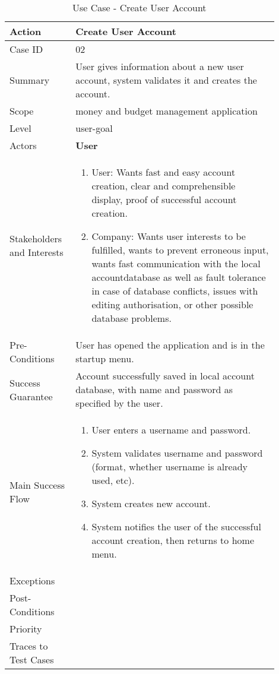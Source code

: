 \documentclass[11pt]{article}
\newcounter{use case ID}
\newcommand\tabularhead[1]{
\begin{table}[ht]
    \addtocounter{use case ID}{1}
    \caption{Use Case \arabic{use case ID} - #1}
    \vspace{0.2cm}
    \begin{tabular}{|p{0.2\linewidth}|p{0.70\linewidth}|}
    \hline
        \textbf{Action} & \textbf{#1} \\
        \hline}
\newcommand\addrow[2]{#1 & #2\\ \hline}
\newcommand\addmulrow[2]{ \begin{minipage}[t][][t]{2.5cm}#1\end{minipage}
        &\begin{minipage}[t][][t]{11cm}
        \begin{enumerate}[itemsep=-1ex] #2   \end{enumerate}
    \end{minipage}\vfill\\ \hline}
\newenvironment{usecase}{\tabularhead}
{\hline\end{tabular}\end{table}}
\begin{document}
\begin{usecase}{Create User Account}
    \rule{0pt}{4ex}
    \addrow{Case ID}{02}
    \addrow{Summary}{User gives information about a new user account, system validates it and creates the account.}
    \addrow{Scope}{money and budget management application}
    \addrow{Level}{user-goal}
    \addrow{Actors}{\textbf{User}}
    \addmulrow{Stakeholders and Interests}{
        \item User: Wants fast and easy account creation, clear and comprehensible display, proof of successful account creation.
        \item Company: Wants user interests to be fulfilled, wants to prevent erroneous input, wants fast communication with the local accountdatabase as well as fault tolerance in case of database conflicts, issues with editing authorisation, or other possible database problems.}
    \addrow{Pre-Conditions}{User has opened the application and is in the startup menu.}
    \addrow{Success Guarantee}{Account successfully saved in local account database, with name and password as specified by the user.}
    \addmulrow{Main Success Flow}{
        \item User enters a username and password.
        \item System validates username and password (format, whether username is already used, etc).
        \item System creates new account.
        \item System notifies the user of the successful account creation, then returns to home menu.}
    \addrow{Exceptions}{}
    \addrow{Post-Conditions}{}
    \addrow{Priority}{}
    \addrow{Traces to Test Cases}{}
\end{usecase}
\end{document}
